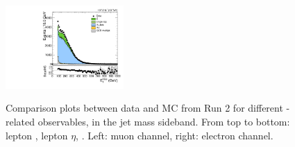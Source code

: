 \begin{figure}[htbp]
  \includegraphics[width=0.4\textwidth]{fig/controlPlots/SB_b1_e_allP_allC_allE_Run2_met_pt.pdf}\\
  \caption{
    Comparison plots between data and MC from Run 2 for different \Wlep-related observables, in the jet mass sideband.
    From top to bottom: lepton \pt, lepton $\eta$, \Etmiss.
    Left: muon channel, right: electron channel.
  }
  \label{fig:SB_controlPlotsRun2_1}
\end{figure}

